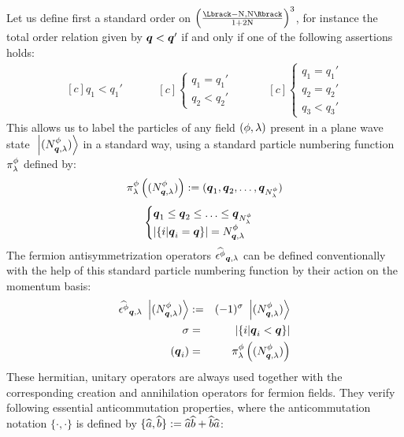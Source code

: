 \documentclass[10pt,a4paper,twoside,openany]{book}
\begin{document}
Let us define first a standard order on $\FLD$, for instance the total order relation given by $\boldsymbol{q} < \boldsymbol{q}'$ if and only if one of the following assertions holds:
\begin{equation*}
\begin{aligned}[c]
q_1 < q_1'
\end{aligned}
\hspace{1cm}
\begin{aligned}[c]
\begin{cases}
q_1 = q_1' \\
q_2 < q_2'
\end{cases}
\end{aligned}
\hspace{1cm}
\begin{aligned}[c]
\begin{cases}
q_1 = q_1' \\
q_2 = q_2' \\
q_3 < q_3'
\end{cases}
\end{aligned}
\end{equation*}
This allows us to label the particles of any field $(\phi, \lambda)$ present in a plane wave state $\ \left|{({N}^{\phi}_{{\boldsymbol{q}}, {\lambda}})}\right\rangle$ in a standard way, using a standard particle numbering function $\pi^{\phi}_{\lambda}$ defined by:
\begin{equation*}
\pi^{\phi}_{\lambda} \left( ({N}^{\phi}_{{\boldsymbol{q}}, {\lambda}}) \right) := (\boldsymbol{q}_1, \boldsymbol{q}_2, \dotsc, \boldsymbol{q}_{N^\phi_\lambda})
\end{equation*}
\begin{equation*}
\begin{cases}
\boldsymbol{q}_1 \leq \boldsymbol{q}_2 \leq \dotsc \leq \boldsymbol{q}_{N^\phi_\lambda} \\
\left| \{ i | \boldsymbol{q}_i = \boldsymbol{q} \} \right| = {N}^{\phi}_{{\boldsymbol{q}}, {\lambda}}
\end{cases}
\end{equation*}
The fermion antisymmetrization operators $\widehat{\epsilon^{\phi}}_{{\boldsymbol{q}}, {\lambda}}$ can be defined conventionally with the help of this standard particle numbering function by their action on the momentum basis:
\begin{eqnarray*}
\widehat{\epsilon^{\phi}}_{{\boldsymbol{q}}, {\lambda}} \ \left|{({N}^{\phi}_{{\boldsymbol{q}}, {\lambda}})}\right\rangle & := & (-1)^\sigma \ \left|{({N}^{\phi}_{{\boldsymbol{q}}, {\lambda}})}\right\rangle \\
\sigma & = & \left| \{ i | \boldsymbol{q}_i < \boldsymbol{q} \} \right| \\
(\boldsymbol{q}_i) & = & \pi^{\phi}_{\lambda} \left( ({N}^{\phi}_{{\boldsymbol{q}}, {\lambda}}) \right)
\end{eqnarray*}
These hermitian, unitary operators are always used together with the corresponding creation and annihilation operators for fermion fields. They verify following essential anticommutation properties, where the anticommutation notation $\{\cdot, \cdot\}$ is defined by $\{ \widehat{a}, \widehat{b}\} := \widehat{a} \widehat{b} + \widehat{b} \widehat{a}$:
\end{document}
